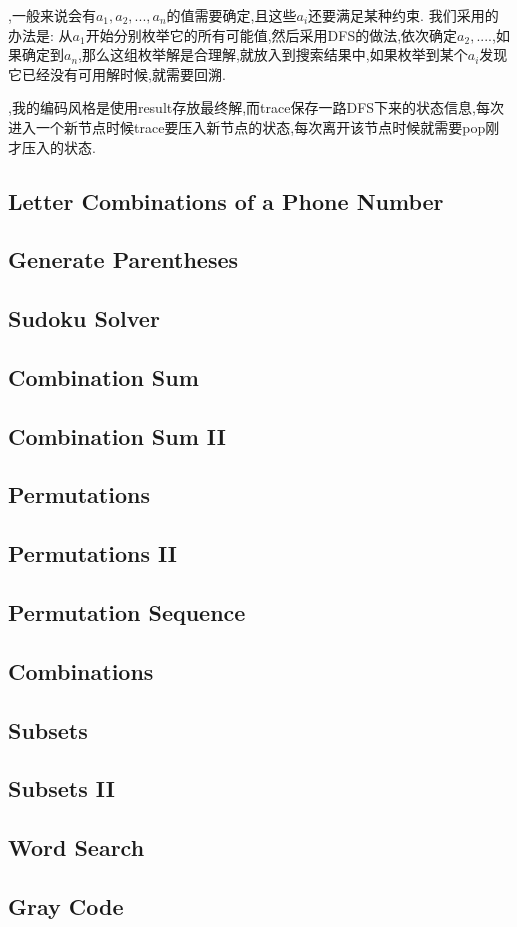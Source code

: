 
,一般来说会有$a_1, a_2, ..., a_n$的值需要确定,且这些$a_i$还要满足某种约束. 我们采用的办法是: 从$a_1$开始分别枚举它的所有可能值,然后采用DFS的做法,依次确定$a_2, ....$,如果确定到$a_n$,那么这组枚举解是合理解,就放入到搜索结果中,如果枚举到某个$a_i$发现它已经没有可用解时候,就需要回溯.

,我的编码风格是使用result存放最终解,而trace保存一路DFS下来的状态信息,每次进入一个新节点时候trace要压入新节点的状态,每次离开该节点时候就需要pop刚才压入的状态.
\subsection{Letter Combinations of a Phone Number}

\subsection{Generate Parentheses}

\subsection{Sudoku Solver}

\subsection{Combination Sum}

\subsection{Combination Sum II}

\subsection{Permutations}

\subsection{Permutations II}

\subsection{Permutation Sequence}

\subsection{Combinations}

\subsection{Subsets}

\subsection{Subsets II}

\subsection{Word Search}

\subsection{Gray Code}

